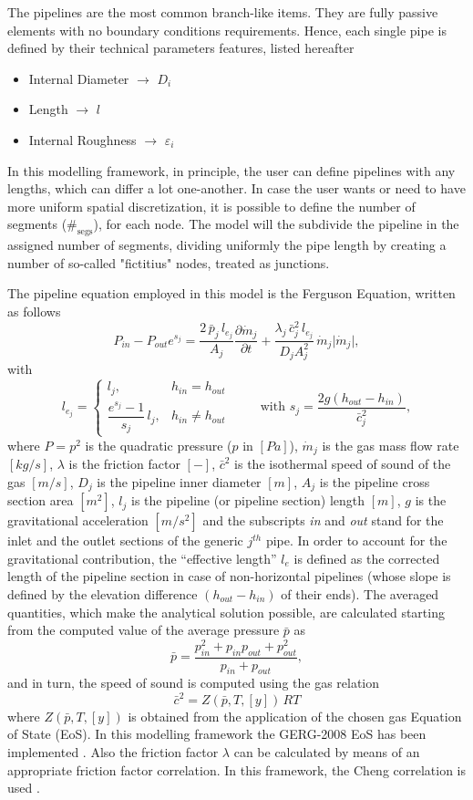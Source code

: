 The pipelines are the most common branch-like items. They are fully passive elements with no boundary conditions requirements. Hence, each single pipe is defined by their technical parameters features, listed hereafter
\begin{itemize}
    \item Internal Diameter $\rightarrow$  $D_i$
    \item Length $\rightarrow$  $l$
    \item Internal Roughness $\rightarrow$  $\varepsilon_i$
\end{itemize}
In this modelling framework, in principle, the user can define pipelines with any lengths, which can differ a lot one-another. In case the user wants or need to have more uniform spatial discretization, it is possible to define the number of segments ($\#_{\text{segs}}$), for each node. The model will the subdivide the pipeline in the assigned number of segments, dividing uniformly the pipe length by creating a number of so-called "fictitius" nodes, treated as junctions.

The pipeline equation employed in this model is the Ferguson Equation, written as follows
\begin{equation*}
P_{in} - P_{out} e^{s_j}
= \frac{2 \, \bar{p}_j \, l_{e_j}}{A_j} \frac{\partial \dot{m}_j}{\partial t}
+ \frac{\lambda_j \, \bar{c}_j^{2} \, l_{e_j}}{D_j A_j^{2}} \, \dot{m}_j \lvert \dot{m}_j \rvert,
\end{equation*}
with
\[
l_{e_j} =
\begin{cases}
l_j, & h_{in} = h_{out} \\[8pt]
\dfrac{e^{s_j} - 1}{s_j} \, l_j, & h_{in} \neq h_{out}
\end{cases}
\qquad \text{ with  }
s_j = \dfrac{2 g (h_{out} - h_{in})}{\bar{c}_j^2},
\]
where $P=p^2$ is the quadratic pressure ($p$ in $[Pa]$), $\dot{m}_j$ is the gas mass flow rate $[kg/s]$, $\lambda$ is the friction factor $[-]$, $\bar{c}^{2}$ is the isothermal speed of sound of the gas $[m/s]$, $D_j$ is the pipeline inner diameter $[m]$, $A_j$ is the pipeline cross section area $[m^2]$, $l_j$ is the pipeline (or pipeline section) length $[m]$, $g$ is the gravitational acceleration $[m/s^2]$ and the subscripts \textit{in} and \textit{out} stand for the inlet and the outlet sections of the generic $j^{th}$ pipe. 
In order to account for the gravitational contribution, the ``effective length'' $l_e$ is defined as the corrected length of the pipeline section in case of non-horizontal pipelines (whose slope is defined by the elevation difference $(h_{out} - h_{in})$ of their ends).
The averaged quantities, which make the analytical solution possible,  are calculated starting from the computed value of the average pressure $\bar{p}$ as
\[
\bar{p} = \frac{p_{in}^2 + p_{in}p_{out} + p_{out}^2}{p_{in} + p_{out}},
\]
and in turn, the speed of sound is computed using the gas relation
\[
\bar{c}^2 = Z(\bar{p}, T, [y]) \, R T
\]
where $Z(\bar{p}, T, [y])$ is obtained from the application of the chosen gas Equation of State (EoS). In this modelling framework the GERG-2008 EoS has been implemented \cite{GERG}. Also the friction factor $\lambda$ can be calculated by means of an appropriate friction factor correlation. In this framework, the Cheng correlation is used \cite{CHENG}.

